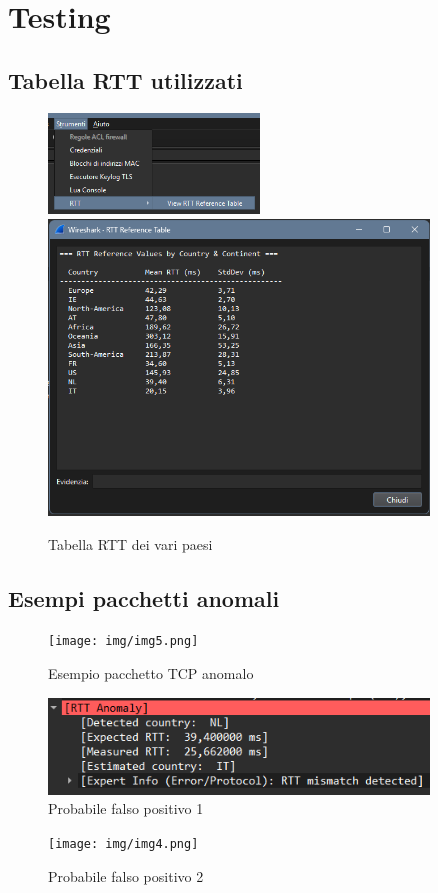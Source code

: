 \chapter{Testing}

\section{Tabella RTT utilizzati}
\begin{figure}[H]
  \centering
  \includegraphics[width=0.5\textwidth]{img/img1.png}
  \includegraphics[width=0.9\textwidth]{img/img2.png}
  \caption{Tabella RTT dei vari paesi}
\end{figure}

\newpage

\section{Esempi pacchetti anomali}
\begin{figure}[H]
  \centering
  \texttt{[image: img/img5.png]}
  \caption{Esempio pacchetto TCP anomalo}
\end{figure}
\begin{figure}[H]
  \centering
  \includegraphics[width=0.9\textwidth]{img/img3.png}
  \caption{Probabile falso positivo 1}
\end{figure}
\begin{figure}[H]
  \centering
  \texttt{[image: img/img4.png]}
  \caption{Probabile falso positivo 2}
\end{figure}
